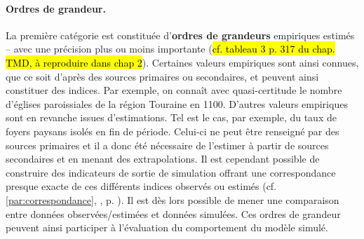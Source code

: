 \paragraph{Ordres de grandeur.}
La première catégorie est constituée d'\textbf{ordres de grandeurs} empiriques estimés -- avec une précision plus ou moins importante (\hl{cf. tableau 3 p. 317 du chap. TMD, à reproduire dans chap 2}).
Certaines valeurs empiriques sont ainsi connues, que ce soit d'après des sources primaires ou secondaires, et peuvent ainsi constituer des indices.
Par exemple, on connaît avec quasi-certitude le nombre d'églises paroissiales de la région Touraine en 1100.
D'autres valeurs empiriques sont en revanche issues d'estimations.
Tel est le cas, par exemple, du taux de foyers paysans isolés en fin de période.
Celui-ci ne peut être renseigné par des sources primaires et il a donc été nécessaire de l'estimer à partir de sources secondaires et en menant des extrapolations.
Il est cependant possible de construire des indicateurs de sortie de simulation offrant une correspondance presque exacte de ces différents indices observés ou estimés (cf. \ref{par:correspondance}, , p. \pageref{par:correspondance}).
Il est dès lors possible de mener une comparaison entre données observées/estimées et données simulées.
Ces ordres de grandeur peuvent ainsi participer à l'évaluation du comportement du modèle simulé.

